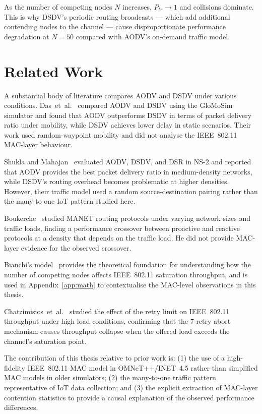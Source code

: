 As the number of competing nodes $N$ increases, $P_{tr} \to 1$ and collisions dominate.
This is why DSDV's periodic routing broadcasts --- which add additional contending nodes
to the channel --- cause disproportionate performance degradation at $N = 50$ compared
with AODV's on-demand traffic model.

\section{Related Work}

A substantial body of literature compares AODV and DSDV under various conditions.
Das~et~al.~\cite{das2000performance} compared AODV and DSDV using the GloMoSim
simulator and found that AODV outperforms DSDV in terms of packet delivery ratio under
mobility, while DSDV achieves lower delay in static scenarios. Their work used
random-waypoint mobility and did not analyse the IEEE~802.11 MAC-layer behaviour.

Shukla and Mahajan~\cite{shukla2013performance} evaluated AODV, DSDV, and DSR in NS-2
and reported that AODV provides the best packet delivery ratio in medium-density networks,
while DSDV's routing overhead becomes problematic at higher densities. However, their
traffic model used a random source-destination pairing rather than the many-to-one IoT
pattern studied here.

Boukerche~\cite{boukerche2004} studied MANET routing protocols under varying network
sizes and traffic loads, finding a performance crossover between proactive and reactive
protocols at a density that depends on the traffic load. He did not provide MAC-layer
evidence for the observed crossover.

Bianchi's model~\cite{bianchi2000} provides the theoretical foundation for understanding
how the number of competing nodes affects IEEE~802.11 saturation throughput, and is used
in Appendix~\ref{app:math} to contextualise the MAC-level observations in this thesis.

Chatzimisios~et~al.~\cite{chatzimisios2003} studied the effect of the retry limit on
IEEE~802.11 throughput under high load conditions, confirming that the 7-retry abort
mechanism causes throughput collapse when the offered load exceeds the channel's
saturation point.

The contribution of this thesis relative to prior work is: (1) the use of a high-fidelity
IEEE~802.11 MAC model in OMNeT++/INET~4.5 rather than simplified MAC models in older
simulators; (2) the many-to-one traffic pattern representative of IoT data collection;
and (3) the explicit extraction of MAC-layer contention statistics to provide a causal
explanation of the observed performance differences.
